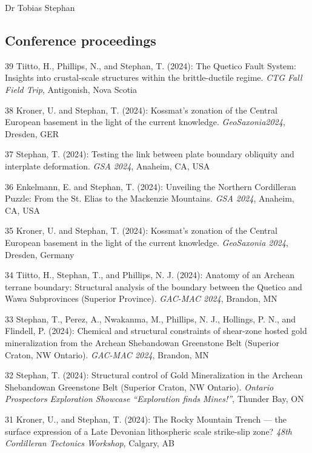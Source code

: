 \documentclass[10pt, paper=letter]{scrartcl} %
\begin{document}
\begin{cv}{\textsf{Dr Tobias Stephan}}
    \subsection{Conference proceedings}
    \begin{cvlist}{} %
        \item[39] Tiitto, H., Phillips, N., and Stephan, T. (2024): The Quetico Fault System: Insights into crustal-scale structures within the brittle-ductile regime. \textit{CTG Fall Field Trip},  Antigonish, Nova Scotia
        \item[38] Kroner, U. and Stephan, T. (2024): Kossmat’s zonation of the Central European basement in the light of the current knowledge. \textit{GeoSaxonia2024}, Dresden, GER
        \item[37] Stephan, T. (2024): Testing the link between plate boundary obliquity and interplate deformation. \textit{GSA 2024}, Anaheim, CA, USA
        \item[36] Enkelmann, E. and Stephan, T. (2024): Unveiling the Northern Cordilleran Puzzle: From the St. Elias to the Mackenzie Mountains. \textit{GSA 2024}, Anaheim, CA, USA
        \item[35] Kroner, U. and Stephan, T. (2024): Kossmat’s zonation of the Central European basement in the light of the current knowledge. \textit{GeoSaxonia 2024}, Dresden, Germany
        \item[34] Tiitto, H., Stephan, T., and Phillips, N. J. (2024): Anatomy of an Archean terrane boundary: Structural analysis of the boundary between the Quetico and Wawa Subprovinces (Superior Province). \textit{GAC-MAC 2024}, Brandon, MN
        \item[33] Stephan, T., Perez, A., Nwakanma, M., Phillips, N. J., Hollings, P. N., and Flindell, P. (2024): Chemical and structural constraints of shear-zone hosted gold mineralization from the Archean Shebandowan Greenstone Belt (Superior Craton, NW Ontario). \textit{GAC-MAC 2024}, Brandon, MN
        \item[32] Stephan, T. (2024): Structural control of Gold Mineralization in the Archean Shebandowan Greenstone Belt (Superior Craton, NW Ontario). \textit{Ontario Prospectors Exploration Showcase \enquote{Exploration finds Mines!}}, Thunder Bay, ON
        \item[31] Kroner, U., and Stephan, T. (2024): The Rocky Mountain Trench --- the surface expression of a Late Devonian lithospheric scale strike-slip zone? \textit{48th Cordilleran Tectonics Workshop}, Calgary, AB

\end{cvlist}
\end{cv}
\end{document}
